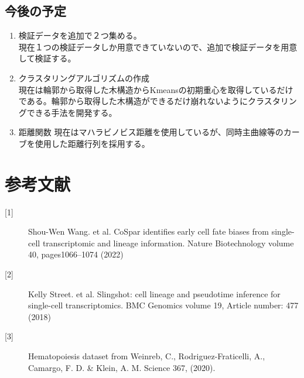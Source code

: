 \documentclass{article}
\begin{document}
\subsection{今後の予定}
\begin{enumerate}
    \item 検証データを追加で２つ集める。\\
        現在１つの検証データしか用意できていないので、追加で検証データを用意して検証する。
    \item クラスタリングアルゴリズムの作成\\
        現在は輪郭から取得した木構造からKmeansの初期重心を取得しているだけである。輪郭から取得した木構造ができるだけ崩れないようにクラスタリングできる手法を開発する。
    \item 距離関数
        現在はマハラビノビス距離を使用しているが、同時主曲線等のカーブを使用した距離行列を採用する。
\end{enumerate}

\section{参考文献}
\begin{description}
  \item[\textnormal{[1]}] Shou-Wen Wang. et al. CoSpar identifies early cell fate biases from single-cell transcriptomic and lineage information. Nature Biotechnology volume 40, pages1066–1074 (2022)
  \item[\textnormal{[2]}] Kelly Street. et al. Slingshot: cell lineage and pseudotime inference for single-cell transcriptomics. BMC Genomics volume 19, Article number: 477 (2018)
  \item[\textnormal{[3]}] Hematopoiesis dataset from Weinreb, C., Rodriguez-Fraticelli, A., Camargo, F. D. & Klein, A. M. Science 367, (2020).
\end{description}
\end{document}
